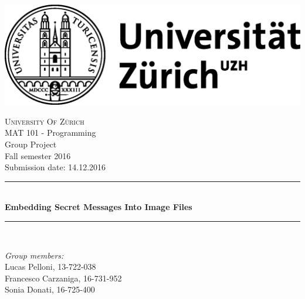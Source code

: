 \documentclass[
parskip=full,               %
12pt,                       %
twoside,                    %
a4paper                     %
]{article}
\begin{document}
	
	\begin{titlepage}

\newcommand{\HRule}{\rule{\linewidth}{0.5mm}} %

\center %
 
\begin{center}
\includegraphics[scale = 1]{./uzhlogo}
\end{center} 
\textsc{\LARGE University Of Zürich}\\[1.5cm] %
\Large MAT 101 - Programming\\
\Large Group Project\\
\Large Fall semester 2016 \\[0.5cm]
\large Submission date: 14.12.2016 \\[0.5cm] %


\HRule \\[0.4cm]
{ \huge \bfseries Embedding Secret Messages Into Image Files }\\[0.4cm] %
\HRule \\[1.5cm]
 

\begin{minipage}{0.5\textwidth}
\centering
\emph{Group members:}\\ 
Lucas Pelloni, 13-722-038\\
Francesco Carzaniga, 16-731-952 \\
Sonia Donati, 16-725-400  \\
\end{minipage}



\end{titlepage}
\end{document}
